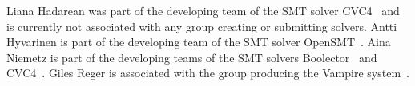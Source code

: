 \documentclass[12pt]{article}
\begin{document}
%
Liana Hadarean was part of the developing team of the SMT solver
CVC4~\cite{cvc4} and is currently not associated with any group
creating or submitting solvers.
Antti Hyvarinen is part of the developing team of the SMT solver
OpenSMT~\cite{opensmt2}.
Aina Niemetz is part of the developing teams of the SMT solvers
Boolector~\cite{boolector}
and CVC4~\cite{cvc4}.
Giles Reger is associated with the group
producing the Vampire system~\cite{vampire}.


\pagebreak



\end{document}
